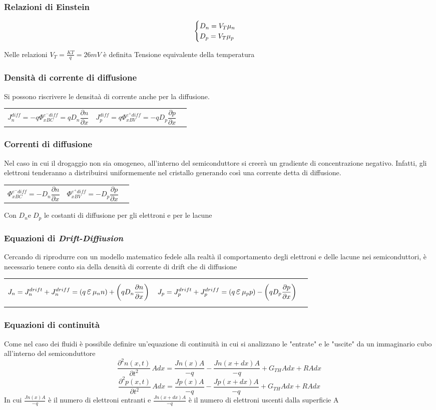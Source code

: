 \documentclass[12pt,a4paper]{article}
\makeatletter
\newcommand{\pdv}[3]{\frac{\partial^{#2} #1}{\partial #3^{#2}}}
\newcommand{\Beps}{ \mathlarger{\mathlarger{ \varepsilon }}}
\newcommand{\eqlist}[4]{ 
	\subsubsection*{#1}
	\parbox{19cm}{#2}
	
	\begin{equation}
	#3
	\end{equation}
	\noindent\parbox{19cm}{#4}}
\newcommand{\deqlist}[5]{
	\subsubsection*{#1}
	
	\parbox{19cm}{#2}
	
	\noindent\begin{tabularx}{\textwidth}{@{}XXX@{}}
	\begin{equation}
	#3
	\end{equation}  & 
	\begin{equation}
	#4
	\end{equation}
	
	\end{tabularx}
	
	\noindent\parbox{19cm}{#5}}
\makeatother
\begin{document}
		
		\eqlist{Relazioni di Einstein}
		{}
		{\begin{cases}
				D_{n} = V_{T } \mu_{n} \\ D_{p} = V_{T} \mu_{p} 
			\end{cases} \\}
		{Nelle relazioni $ V_{T} = \frac{K T}{q} = 26 mV$ è definita Tensione equivalente della temperatura }
		
		\deqlist{Densità di corrente di diffusione}
		{Si possono riscrivere le densitaà di corrente anche per la diffusione.}
		{J_{n}^{diff} = -q \Phi^{e^{-}diff}_{xBC} = q D_{n} \frac{\partial n}{\partial x}}
		{J_{p}^{diff} = q \Phi^{e^{+}diff}_{xBV} = -q D_{p} \frac{\partial p}{\partial x}}
		{}
		
		
		\deqlist{Correnti di diffusione}
		{Nel caso in cui il drogaggio non sia omogeneo, all'interno del semiconduttore si creerà un gradiente di concentrazione negativo. Infatti, gli elettroni tenderanno a distribuirsi uniformemente nel cristallo generando così una corrente detta di diffusione.}
		{\Phi^{e^{-}diff}_{xBC} = - D_{n} \frac{\partial n}{\partial x}}
		{\Phi^{e^{+}diff}_{xBV} = - D_{p} \frac{\partial p}{\partial x}}
		{Con $ D_{n} \text{e}\; D_{p} $ le costanti di diffusione per gli elettroni e per le lacune}
		
	
		
		\deqlist{Equazioni di \textbf{\textit{Drift-Diffiusion}}}
		{Cercando di riprodurre con un modello matematico fedele alla realtà il comportamento degli elettroni e delle lacune nei semiconduttori, è necessario tenere conto sia della densità di corrente di drift che di diffusione}
		{J_{n} = J_{n}^{drift} + J_{n}^{driff} = (q \, \Beps \, \mu_{n} n )+\bigg( q D_{n} \frac{\partial n}{\partial x} \bigg)}
		{J_{p} = J_{p}^{drift} + J_{p}^{driff} = (q \, \Beps \, \mu_{p} p )-\bigg( q D_{p} \frac{\partial p}{\partial x} \bigg)}
		{}
		
		
		\subsubsection*{Equazioni di continuità}
		Come nel caso dei fluidi è possibile definire un'equazione di continuità in cui si analizzano le "entrate" e le "uscite" da un immaginario cubo all'interno del semiconduttore
		\begin{equation}
			\pdv{n(x,t)}{2}{t} \, Adx = \frac{Jn(x)A}{-q} - \frac{Jn(x+dx)A}{-q} + G_{TH}Adx + RAdx
		\end{equation}
		\begin{equation}
			\pdv{p(x,t)}{2}{t} \, Adx = \frac{Jp(x)A}{-q} - \frac{Jp(x+dx)A}{-q} + G_{TH}Adx + RAdx
		\end{equation}
		In cui $ \frac{Jn(x)A}{-q} $ è il numero di elettroni entranti e  $ \frac{Jn(x + dx)A}{-q} $ è il numero di elettroni uscenti dalla superficie A
		
\end{document}
